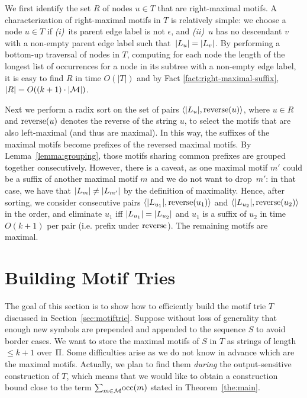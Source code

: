 We first identify the set $R$ of nodes $u \in T$ that are right-maximal motifs. A characterization of right-maximal motifs in $T$ is relatively simple: we choose a node $u \in T$ if \emph{(i)}~its parent edge label is not $\epsilon$, and \emph{(ii)}~$u$ has no descendant $v$ with a non-empty parent edge label such that~$|L_{u}| = |L_{v}|$. By performing a bottom-up traversal of nodes in $T$, computing for each node the length of the longest list of occurrences for a node in its subtree with a non-empty edge label, it is easy to find $R$ in time $O(|T|)$ and by Fact \ref{fact:right-maximal-suffix}, $|R| = O((k+1) \cdot |\mathcal{M}|)$.

Next we perform a radix sort on the set of pairs $\langle |L_{u}|, \operatorname{reverse}(u) \rangle$, where $u \in R$ and $\operatorname{reverse}(u)$ denotes the reverse of the string $u$, to select the motifs that are also left-maximal (and thus are maximal). In this way, the suffixes of the maximal motifs become prefixes of the reversed maximal motifs. By Lemma~\ref{lemma:grouping}, those motifs sharing common prefixes are grouped together consecutively. However, there is a caveat, as one maximal motif $m'$ could be a suffix of another maximal motif $m$ and we do not want to drop~$m'$: in that case, we have that $|L_{m}| \neq |L_{m'}|$ by the definition of maximality. Hence, after sorting, we consider consecutive pairs $\langle |L_{u_1}|, \operatorname{reverse}(u_1) \rangle$ and $\langle |L_{u_2}|, \operatorname{reverse}(u_2) \rangle$ in the order, and eliminate $u_1$ iff $|L_{u_1}|=|L_{u_2}|$ and $u_1$ is a suffix of $u_2$ in time $O(k+1)$ per pair (i.e. prefix under $\operatorname{reverse}$). The remaining motifs are maximal.


\section{Building Motif Tries}
\label{sec:construction}

The goal of this section is to show how to efficiently build the motif trie $T$ discussed in Section~\ref{sec:motiftrie}. Suppose without loss of generality that enough new symbols are prepended and appended to the sequence $S$ to avoid border cases. We want to store the maximal motifs of $S$ in $T$ as strings of length $\leq k+1$  over $\Pi$. Some difficulties arise as we do not know in advance which are the maximal motifs. Actually, we plan to find them \emph{during} the output-sensitive construction of $T$, which means that we would like to obtain a construction bound close to the term $\sum_{m \in \mathcal{M}} \! \operatorname{occ}(m)$ stated in Theorem~\ref{the:main}. 

